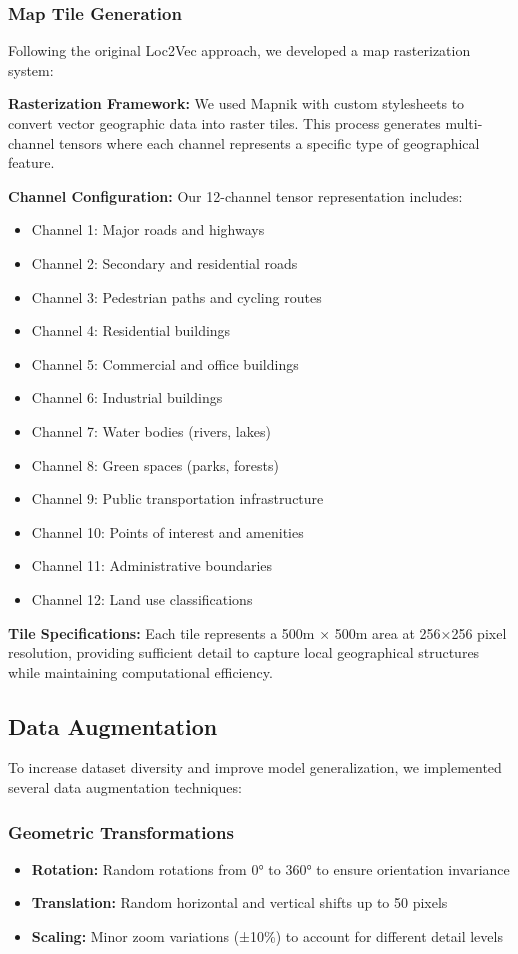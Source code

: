 \subsubsection{Map Tile Generation}

Following the original Loc2Vec approach, we developed a map rasterization system:

\textbf{Rasterization Framework:} We used Mapnik with custom stylesheets to convert vector geographic data into raster tiles. This process generates multi-channel tensors where each channel represents a specific type of geographical feature.

\textbf{Channel Configuration:} Our 12-channel tensor representation includes:
\begin{itemize}
    \item Channel 1: Major roads and highways
    \item Channel 2: Secondary and residential roads
    \item Channel 3: Pedestrian paths and cycling routes
    \item Channel 4: Residential buildings
    \item Channel 5: Commercial and office buildings
    \item Channel 6: Industrial buildings
    \item Channel 7: Water bodies (rivers, lakes)
    \item Channel 8: Green spaces (parks, forests)
    \item Channel 9: Public transportation infrastructure
    \item Channel 10: Points of interest and amenities
    \item Channel 11: Administrative boundaries
    \item Channel 12: Land use classifications
\end{itemize}

\textbf{Tile Specifications:} Each tile represents a 500m × 500m area at 256×256 pixel resolution, providing sufficient detail to capture local geographical structures while maintaining computational efficiency.

\subsection{Data Augmentation}

To increase dataset diversity and improve model generalization, we implemented several data augmentation techniques:

\subsubsection{Geometric Transformations}
\begin{itemize}
    \item \textbf{Rotation:} Random rotations from 0° to 360° to ensure orientation invariance
    \item \textbf{Translation:} Random horizontal and vertical shifts up to 50 pixels
    \item \textbf{Scaling:} Minor zoom variations (±10\%) to account for different detail levels
\end{itemize}

